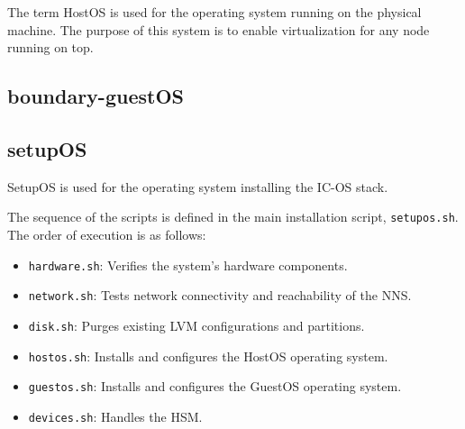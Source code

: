 The term HostOS is used for the operating system running on the physical machine. The purpose of this system is to enable virtualization for any node running on top.

\subsection{boundary-guestOS}

\subsection{setupOS}

SetupOS is used for the operating system installing the IC-OS stack.

The sequence of the scripts is defined in the main installation script, \texttt{setupos.sh}. The order of execution is as follows:

\begin{itemize}
  \item \texttt{hardware.sh}: Verifies the system's hardware components.
  \item \texttt{network.sh}: Tests network connectivity and reachability of the NNS.
  \item \texttt{disk.sh}: Purges existing LVM configurations and partitions.
  \item \texttt{hostos.sh}: Installs and configures the HostOS operating system.
  \item \texttt{guestos.sh}: Installs and configures the GuestOS operating system.
  \item \texttt{devices.sh}: Handles the HSM.
\end{itemize}
